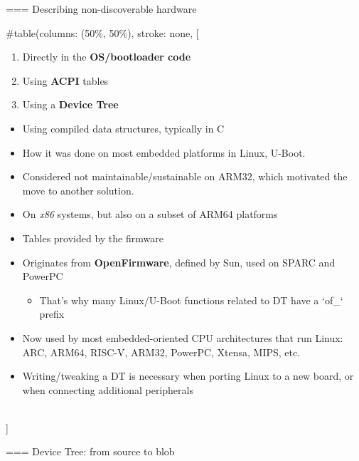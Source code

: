 === {Describing non-discoverable hardware}
  
#table(columns: (50\%, 50\%), stroke: none,
[
    \begin{enumerate}
    \item<1> Directly in the {\bf OS/bootloader code}
    \item<2> Using {\bf ACPI} tables
    \item<3> Using a {\bf Device Tree}
    \end{enumerate}
     {
      \begin{itemize}
      \item Using compiled data structures, typically in C
      \item How it was done on most embedded platforms in Linux, U-Boot.
      \item Considered not maintainable/sustainable on ARM32, which
        motivated the move to another solution.
      \end{itemize}
    }
     {
      \begin{itemize}
      \item On {\em x86} systems, but also on a subset of ARM64 platforms
      \item Tables provided by the firmware
      \end{itemize}
    }
     {
      \begin{itemize}
      \item Originates from {\bf OpenFirmware}, defined by Sun, used on
        SPARC and PowerPC
        \begin{itemize}
        \item That's why many Linux/U-Boot functions related to DT have
          a `of_` prefix
        \end{itemize}
      \item Now used by most embedded-oriented CPU architectures that run
        Linux: ARC, ARM64, RISC-V, ARM32, PowerPC, Xtensa, MIPS, etc.
      \item Writing/tweaking a DT is necessary when porting Linux to a
        new board, or when connecting additional peripherals
      \end{itemize}
    }
  \\]


=== {Device Tree: from source to blob}
  
